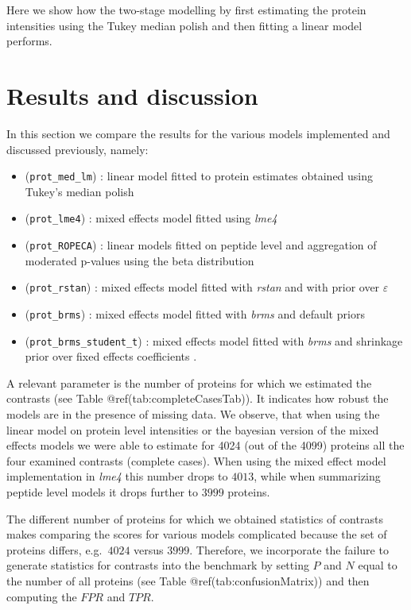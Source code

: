 \documentclass[journal=jacsat,manuscript=article]{achemso}
\begin{document}
Here we show how the two-stage modelling by first estimating the protein
intensities using the Tukey median polish and then fitting a linear
model performs.

\hypertarget{results-and-discussion}{%
\section{Results and discussion}\label{results-and-discussion}}

In this section we compare the results for the various models
implemented and discussed previously, namely:

\begin{itemize}
\tightlist
\item
  (\texttt{prot\_med\_lm}) : linear model fitted to protein estimates
  obtained using Tukey's median polish
\item
  (\texttt{prot\_lme4}) : mixed effects model fitted using \emph{lme4}
\item
  (\texttt{prot\_ROPECA}) : linear models fitted on peptide level and
  aggregation of moderated p-values using the beta distribution
\item
  (\texttt{prot\_rstan}) : mixed effects model fitted with \emph{rstan}
  and with prior over \(\varepsilon\)
\item
  (\texttt{prot\_brms}) : mixed effects model fitted with \emph{brms}
  and default priors
\item
  (\texttt{prot\_brms\_student\_t}) : mixed effects model fitted with
  \emph{brms} and shrinkage prior over fixed effects coefficients .
\end{itemize}

A relevant parameter is the number of proteins for which we estimated
the contrasts (see Table @ref(tab:completeCasesTab)). It indicates how
robust the models are in the presence of missing data. We observe, that
when using the linear model on protein level intensities or the bayesian
version of the mixed effects models we were able to estimate for 4024
(out of the 4099) proteins all the four examined contrasts (complete
cases). When using the mixed effect model implementation in \emph{lme4}
this number drops to \(4013\), while when summarizing peptide level
models it drops further to \(3999\) proteins.

The different number of proteins for which we obtained statistics of
contrasts makes comparing the scores for various models complicated
because the set of proteins differs, e.g.~\(4024\) versus \(3999\).
Therefore, we incorporate the failure to generate statistics for
contrasts into the benchmark by setting \(P\) and \(N\) equal to the
number of all proteins (see Table @ref(tab:confusionMatrix)) and then
computing the \(FPR\) and \(TPR\).
\end{document}
